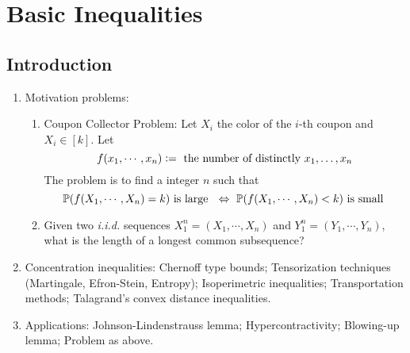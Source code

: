 \chapter{Basic Inequalities}

\section{Introduction}
\begin{enumerate}[label=\arabic{*}.]
	\item Motivation problems: 
	\begin{exam}
	    \begin{enumerate}[label= (\arabic{*})]
	    	\item Coupon Collector Problem: Let $X_i$ the color of the $i$-th coupon and $X_i \in [k]$. Let
			\begin{equation*}
				f(x_1,\cdots,x_n) \vcentcolon= \text{ the number of distinctly } x_1,\dots,x_n
			\end{equation*}
			The problem is to find a integer $n$ such that
			\begin{equation*}
				\mathbb{P}(f(X_1,\cdots,X_n) = k) \text{ is large }~\Leftrightarrow~\mathbb{P}(f(X_1,\cdots,X_n) < k) \text{ is small }
			\end{equation*}
			\item Given two \emph{i.i.d.} sequences $X_1^n = (X_1,\cdots,X_n)$ and $Y_1^n = (Y_1,\cdots,Y_n)$, what is the length of a longest common subsequence? 
	    \end{enumerate}
	\end{exam}

	\item Concentration inequalities: Chernoff type bounds; Tensorization techniques (Martingale, Efron-Stein, Entropy); Isoperimetric inequalities; Transportation methods; Talagrand's convex distance inequalities.

	\item Applications: Johnson-Lindenstrauss lemma; Hypercontractivity; Blowing-up lemma; Problem as above.

\end{enumerate}


